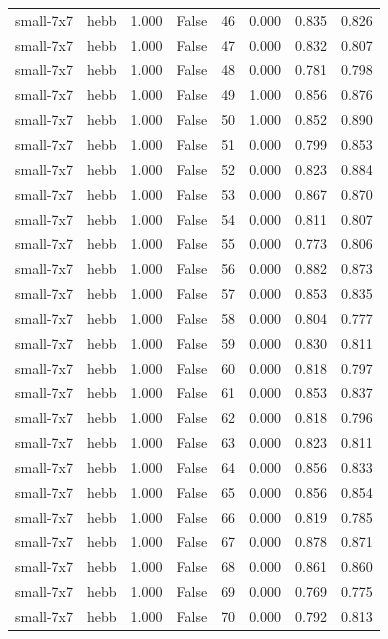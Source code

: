 \begin{tabular}{llrrrrrr}
small-7x7 & hebb & 1.000 & False & 46 & 0.000 & 0.835 & 0.826 \\
small-7x7 & hebb & 1.000 & False & 47 & 0.000 & 0.832 & 0.807 \\
small-7x7 & hebb & 1.000 & False & 48 & 0.000 & 0.781 & 0.798 \\
small-7x7 & hebb & 1.000 & False & 49 & 1.000 & 0.856 & 0.876 \\
small-7x7 & hebb & 1.000 & False & 50 & 1.000 & 0.852 & 0.890 \\
small-7x7 & hebb & 1.000 & False & 51 & 0.000 & 0.799 & 0.853 \\
small-7x7 & hebb & 1.000 & False & 52 & 0.000 & 0.823 & 0.884 \\
small-7x7 & hebb & 1.000 & False & 53 & 0.000 & 0.867 & 0.870 \\
small-7x7 & hebb & 1.000 & False & 54 & 0.000 & 0.811 & 0.807 \\
small-7x7 & hebb & 1.000 & False & 55 & 0.000 & 0.773 & 0.806 \\
small-7x7 & hebb & 1.000 & False & 56 & 0.000 & 0.882 & 0.873 \\
small-7x7 & hebb & 1.000 & False & 57 & 0.000 & 0.853 & 0.835 \\
small-7x7 & hebb & 1.000 & False & 58 & 0.000 & 0.804 & 0.777 \\
small-7x7 & hebb & 1.000 & False & 59 & 0.000 & 0.830 & 0.811 \\
small-7x7 & hebb & 1.000 & False & 60 & 0.000 & 0.818 & 0.797 \\
small-7x7 & hebb & 1.000 & False & 61 & 0.000 & 0.853 & 0.837 \\
small-7x7 & hebb & 1.000 & False & 62 & 0.000 & 0.818 & 0.796 \\
small-7x7 & hebb & 1.000 & False & 63 & 0.000 & 0.823 & 0.811 \\
small-7x7 & hebb & 1.000 & False & 64 & 0.000 & 0.856 & 0.833 \\
small-7x7 & hebb & 1.000 & False & 65 & 0.000 & 0.856 & 0.854 \\
small-7x7 & hebb & 1.000 & False & 66 & 0.000 & 0.819 & 0.785 \\
small-7x7 & hebb & 1.000 & False & 67 & 0.000 & 0.878 & 0.871 \\
small-7x7 & hebb & 1.000 & False & 68 & 0.000 & 0.861 & 0.860 \\
small-7x7 & hebb & 1.000 & False & 69 & 0.000 & 0.769 & 0.775 \\
small-7x7 & hebb & 1.000 & False & 70 & 0.000 & 0.792 & 0.813 \\

\end{tabular}
